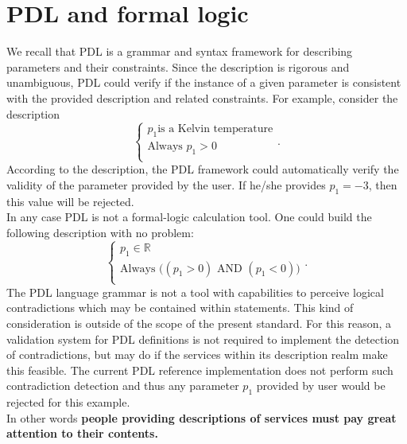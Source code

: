 \documentclass[a4paper,11pt] {ivoa}
\begin{document}
\section{PDL and formal logic}
We recall that PDL is a grammar and syntax framework for describing parameters and their
constraints. Since the description is rigorous and unambiguous, PDL could verify if the instance of
a given parameter is consistent with the provided description and related constraints. For example,
consider the description
\begin{equation}
\left\{
\begin{array}{l}
p_1 \mbox{is a Kelvin temperature}\\
\mbox{Always }  p_1 > 0 \\
\end{array}
\right..
\end{equation}
According to the description, the PDL framework could automatically verify the validity of the
parameter provided by the user.
If he/she provides $p_1=-3$, then this value will be rejected.\\
In any case PDL is not a formal-logic calculation tool. One could build the following description
with no problem:
\begin{equation}
\left\{
\begin{array}{l}
p_1 \in \mathbb R\\
\displaystyle \mbox{Always } \big(  (p_1 > 0) \mbox{ AND } (p_1 < 0) \big)\\
\end{array}
\right..
\end{equation}
The PDL language grammar is not a tool with capabilities to perceive logical contradictions which may be contained within statements. This kind of consideration is outside of the scope of the present standard.
For this reason, a validation system for PDL definitions is not required to implement the detection of contradictions, but may do if the services within its description realm make this feasible.
The current PDL reference implementation does not perform such contradiction detection and thus any parameter $p_1$ provided by user would be rejected for this example.\\
In other words {\bf people providing descriptions of services must pay great attention to their contents.}\\
\end{document}
